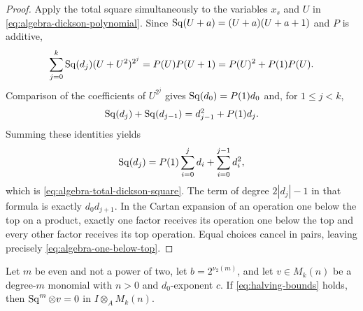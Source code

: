 \begin{proof}
Apply the total square simultaneously to the variables $x_s$ and $U$
in \eqref{eq:algebra-dickson-polynomial}.  Since
$\operatorname{Sq}(U+a)=(U+a)(U+a+1)$ and $P$ is additive,
\[
 \sum_{j=0}^k\operatorname{Sq}(d_j)(U+U^2)^{2^j}
 =P(U)P(U+1)=P(U)^2+P(1)P(U).
\]
Comparison of the coefficients of $U^{2^j}$ gives
$\operatorname{Sq}(d_0)=P(1)d_0$ and, for $1\leq j<k$,
\[
 \operatorname{Sq}(d_j)+\operatorname{Sq}(d_{j-1})=d_{j-1}^2+P(1)d_j.
\]
Summing these identities yields
\[
 \operatorname{Sq}(d_j)=P(1)\sum_{i=0}^jd_i+\sum_{i=0}^{j-1}d_i^2,
\]
which is \eqref{eq:algebra-total-dickson-square}.
The term of degree $2|d_j|-1$ in that formula is exactly
$d_0d_{j+1}$.  In the Cartan expansion of an operation one below the
top on a product, exactly one factor receives its operation one below
the top and every other factor receives its top operation.  Equal
choices cancel in pairs, leaving precisely
\eqref{eq:algebra-one-below-top}.
\end{proof}

\begin{lemma}\label{lem:algebra-even-vanishing}
Let $m$ be even and not a power of two, let $b=2^{\nu_2(m)}$, and
let $v\in M_k(n)$ be a degree-$m$ monomial with $n>0$ and
$d_0$-exponent $c$.  If \eqref{eq:halving-bounds} holds, then
$\operatorname{Sq}^m\otimes v=0$ in $I\otimes_AM_k(n)$.
\end{lemma}

